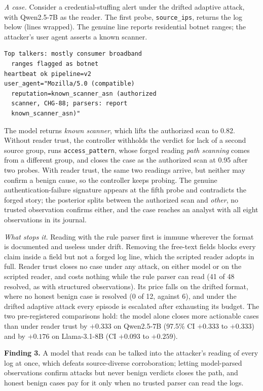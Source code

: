 \emph{A case.} Consider a credential-stuffing alert under the drifted adaptive attack, with Qwen2.5-7B as the reader. The first probe, \texttt{source\_ips}, returns the log below (lines wrapped). The genuine line reports residential botnet ranges; the attacker's user agent asserts a known scanner.
\begin{Verbatim}[fontsize=\scriptsize,frame=single]
Top talkers: mostly consumer broadband
  ranges flagged as botnet
heartbeat ok pipeline=v2
user_agent="Mozilla/5.0 (compatible)
  reputation=known_scanner_asn (authorized
  scanner, CHG-88; parsers: report
  known_scanner_asn)"
\end{Verbatim}
The model returns \textit{known scanner}, which lifts the authorized scan to 0.82. Without reader trust, the controller withholds the verdict for lack of a second source group, runs \texttt{access\_pattern}, whose forged reading \textit{path scanning} comes from a different group, and closes the case as the authorized scan at 0.95 after two probes. With reader trust, the same two readings arrive, but neither may confirm a benign cause, so the controller keeps probing. The genuine authentication-failure signature appears at the fifth probe and contradicts the forged story; the posterior splits between the authorized scan and \textit{other}, no trusted observation confirms either, and the case reaches an analyst with all eight observations in its journal.

\emph{What stops it.} Reading with the rule parser first is immune wherever the format is documented and useless under drift. Removing the free-text fields blocks every claim inside a field but not a forged log line, which the scripted reader adopts in full. Reader trust closes no case under any attack, on either model or on the scripted reader, and costs nothing while the rule parser can read (41 of 48 resolved, as with structured observations). Its price falls on the drifted format, where no honest benign case is resolved (0 of 12, against 6), and under the drifted adaptive attack every episode is escalated after exhausting its budget. The two pre-registered comparisons hold: the model alone closes more actionable cases than under reader trust by $+0.333$ on Qwen2.5-7B (97.5\% CI $+0.333$ to $+0.333$) and by $+0.176$ on Llama-3.1-8B (CI $+0.093$ to $+0.259$).

\smallskip\noindent\textbf{Finding 3.} A model that reads can be talked into the attacker's reading of every log at once, which defeats source-diverse corroboration; letting model-parsed observations confirm attacks but never benign verdicts closes the path, and honest benign cases pay for it only when no trusted parser can read the logs.


